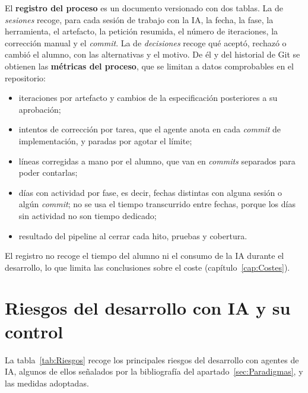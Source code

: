 El \textbf{registro del proceso} es un documento versionado con dos tablas. La de \emph{sesiones} recoge, para cada sesión de trabajo con la IA, la fecha, la fase, la herramienta, el artefacto, la petición resumida, el número de iteraciones, la corrección manual y el \emph{commit}. La de \emph{decisiones} recoge qué aceptó, rechazó o cambió el alumno, con las alternativas y el motivo. De él y del historial de Git se obtienen las \textbf{métricas del proceso}, que se limitan a datos comprobables en el repositorio:

\begin{itemize}
	\item iteraciones por artefacto y cambios de la especificación posteriores a su aprobación;
	\item intentos de corrección por tarea, que el agente anota en cada \emph{commit} de implementación, y paradas por agotar el límite;
	\item líneas corregidas a mano por el alumno, que van en \emph{commits} separados para poder contarlas;
	\item días con actividad por fase, es decir, fechas distintas con alguna sesión o algún \emph{commit}; no se usa el tiempo transcurrido entre fechas, porque los días sin actividad no son tiempo dedicado;
	\item resultado del pipeline al cerrar cada hito, pruebas y cobertura.
\end{itemize}

El registro no recoge el tiempo del alumno ni el consumo de la IA durante el desarrollo, lo que limita las conclusiones sobre el coste (capítulo~\ref{cap:Costes}).

\section{Riesgos del desarrollo con IA y su control}\label{sec:Riesgos}

La tabla~\ref{tab:Riesgos} recoge los principales riesgos del desarrollo con agentes de IA, algunos de ellos señalados por la bibliografía del apartado~\ref{sec:Paradigmas}, y las medidas adoptadas.

